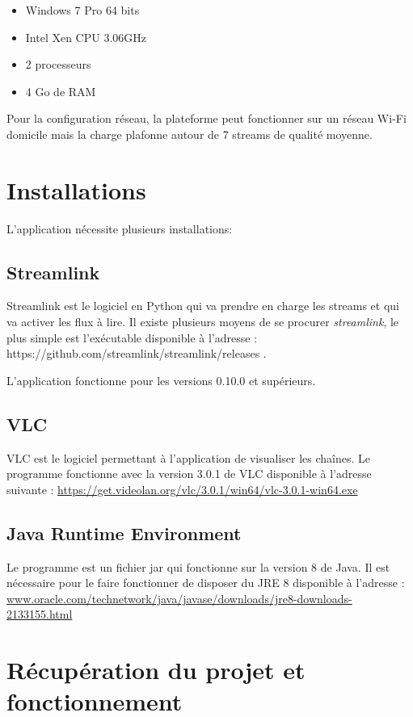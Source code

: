 \documentclass{polytech/polytech}
\begin{document}
\begin{itemize}
	\item Windows 7 Pro 64 bits
	\item Intel Xen CPU 3.06GHz
	\item 2 processeurs
	\item 4 Go de RAM
\end{itemize}


Pour la configuration réseau, la plateforme peut fonctionner sur un réseau Wi-Fi domicile mais la charge plafonne autour de 7 streams de qualité moyenne.


\section{Installations}

L'application nécessite plusieurs installations:

\subsection{Streamlink}

Streamlink est le logiciel en Python qui va prendre en charge les streams et qui va activer les flux à lire. Il existe plusieurs moyens de se procurer \textit{streamlink}, le plus simple est l'exécutable disponible à l'adresse : https://github.com/streamlink/streamlink/releases .

L'application fonctionne pour les versions 0.10.0 et supérieurs.

\subsection{VLC}

VLC est le logiciel permettant à l'application de visualiser les chaînes. Le programme  fonctionne avec la version 3.0.1 de VLC disponible à l'adresse suivante : \url{https://get.videolan.org/vlc/3.0.1/win64/vlc-3.0.1-win64.exe}


\subsection{Java Runtime Environment}

Le programme est un fichier jar qui fonctionne sur la version 8 de Java. Il est nécessaire pour le faire fonctionner de disposer du JRE 8 disponible à l'adresse : \url{www.oracle.com/technetwork/java/javase/downloads/jre8-downloads-2133155.html}


\section{Récupération du projet et fonctionnement}
\end{document}
